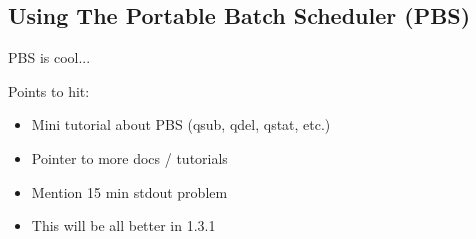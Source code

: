 %
%
%

\subsection{Using The Portable Batch Scheduler (PBS)}
\label{app:pbs-overview}

PBS is cool...

Points to hit:

\begin{itemize}
\item Mini tutorial about PBS (qsub, qdel, qstat, etc.)
\item Pointer to more docs / tutorials
\item Mention 15 min stdout problem
\item This will be all better in 1.3.1
\end{itemize}
